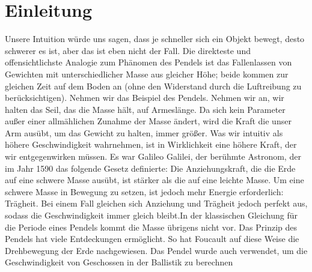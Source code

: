 \documentclass[12pt, a4paper, twoside]{article}
\begin{document}
    
    \newpage

    \section{Einleitung}
    Unsere Intuition würde uns sagen, dass je schneller sich ein Objekt bewegt, desto schwerer
    es ist, aber das ist eben nicht der Fall. Die direkteste und offensichtlichste Analogie
    zum Phänomen des Pendels ist das Fallenlassen von Gewichten mit unterschiedlicher
    Masse aus gleicher Höhe; beide kommen zur gleichen Zeit auf dem Boden an (ohne den
    Widerstand durch die Luftreibung zu berücksichtigen). Nehmen wir das Beispiel des 
    Pendels. Nehmen wir an, wir halten das Seil, das die Masse hält, auf Armeslänge. Da
    sich kein Parameter außer einer allmählichen Zunahme der Masse ändert, wird die Kraft
    die unser Arm ausübt, um das Gewicht zu halten, immer größer.  Was wir intuitiv als
    höhere Geschwindigkeit wahrnehmen, ist in Wirklichkeit eine höhere Kraft, der wir 
    entgegenwirken müssen. Es war Galileo Galilei, der berühmte Astronom, der im Jahr
    1590 das folgende Gesetz definierte: Die Anziehungskraft, die die Erde auf eine schwere
    Masse ausübt, ist stärker als die auf eine leichte Masse. Um eine schwere Masse in 
    Bewegung zu setzen, ist jedoch mehr Energie erforderlich: Trägheit. Bei einem Fall 
    gleichen sich Anziehung und Trägheit jedoch perfekt aus, sodass die Geschwindigkeit 
    immer gleich bleibt.In der klassischen Gleichung für die Periode eines Pendels kommt die 
    Masse übrigens nicht vor. Das Prinzip des Pendels hat viele Entdeckungen ermöglicht. 
    So hat Foucault auf diese Weise die Drehbewegung der Erde nachgewiesen. Das Pendel 
    wurde auch verwendet, um die Geschwindigkeit von Geschossen in der Ballistik zu berechnen
    \newpage
\end{document}

